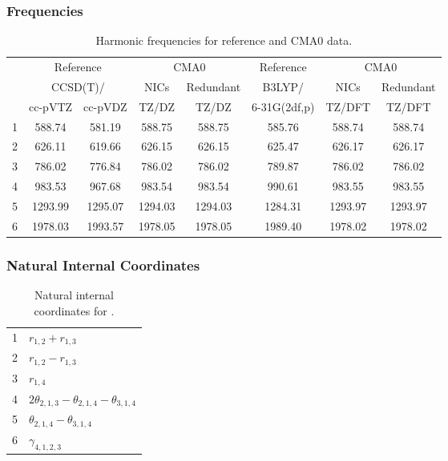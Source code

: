 \documentclass[10pt,oneside]{article}
\begin{document}
\begin{table}[h!]
\subsubsection*{Frequencies}
\centering
\caption{Harmonic frequencies for reference and CMA0 data.}
\begin{tabular}{cccccccc}
\toprule
{} & \multicolumn{2}{c}{Reference} & \multicolumn{2}{c}{CMA0} &    Reference & \multicolumn{2}{c}{CMA0} \\
{} & \multicolumn{2}{c}{CCSD(T)/} &    NICs &  Redundant &       B3LYP/ &    NICs & Redundant \\
{} &   cc-pVTZ & cc-pVDZ &   TZ/DZ &      TZ/DZ & 6-31G(2df,p) &  TZ/DFT &    TZ/DFT \\
\midrule
1 &    588.74 &  581.19 &  588.75 &     588.75 &       585.76 &  588.74 &    588.74 \\
2 &    626.11 &  619.66 &  626.15 &     626.15 &       625.47 &  626.17 &    626.17 \\
3 &    786.02 &  776.84 &  786.02 &     786.02 &       789.87 &  786.02 &    786.02 \\
4 &    983.53 &  967.68 &  983.54 &     983.54 &       990.61 &  983.55 &    983.55 \\
5 &   1293.99 & 1295.07 & 1294.03 &    1294.03 &      1284.31 & 1293.97 &   1293.97 \\
6 &   1978.03 & 1993.57 & 1978.05 &    1978.05 &      1989.40 & 1978.02 &   1978.02 \\
\bottomrule
\end{tabular}
\end{table}

\begin{table}[h!]
\subsubsection*{Natural Internal Coordinates}
\centering
\caption{Natural internal coordinates for .}
\small
\begin{tabular}{ll}
\toprule
  1   & $r_{1,2} + r_{1,3}$ \\
  2   & $r_{1,2} - r_{1,3}$ \\
  3   & $r_{1,4}$ \\
  4   & $2\theta_{2,1,3} - \theta_{2,1,4} - \theta_{3,1,4}$ \\
  5   & $\theta_{2,1,4} - \theta_{3,1,4}$ \\
  6   & $\gamma_{4,1,2,3}$ \\
\bottomrule
\end{tabular}
\end{table}
\end{document}
